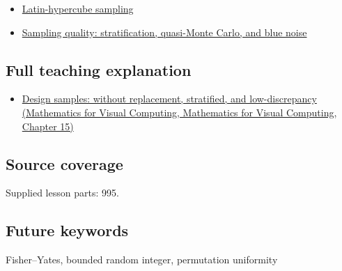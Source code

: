 \begin{itemize}
\tightlist
\item
  \hyperref[appendix-1c5e85693a06]{Latin-hypercube sampling}
\item
  \hyperref[appendix-9f693ffd82bc]{Sampling quality: stratification, quasi-Monte Carlo, and blue noise}
\end{itemize}

\subsection{Full teaching explanation}\label{appendix-184fcc411663-full-teaching-explanation}

\begin{itemize}
\tightlist
\item
  \href{../02-Mathematics-for-Visual-Computing/main.pdf\#nameddest=02-foundations-ii-ch031-design-samples-without-replacement-stratified-and-low-discrepancy}{Design samples: without replacement, stratified, and low-discrepancy (Mathematics for Visual Computing, Mathematics for Visual Computing, Chapter 15)}
\end{itemize}

\subsection{Source coverage}\label{appendix-184fcc411663-source-coverage}

Supplied lesson parts: 995.

\subsection{Future keywords}\label{appendix-184fcc411663-future-keywords}

Fisher--Yates, bounded random integer, permutation uniformity
